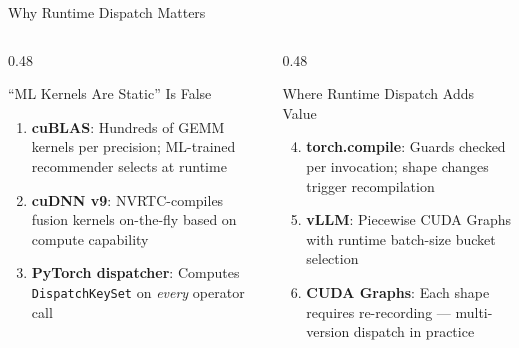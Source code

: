\documentclass[aspectratio=169,10pt]{beamer}
\begin{document}
\begin{frame}{Why Runtime Dispatch Matters}
  \begin{columns}[T]
    \begin{column}{0.48\textwidth}
      \begin{block}{``ML Kernels Are Static'' Is False}
        \begin{enumerate}
          \item \textbf{cuBLAS}: Hundreds of GEMM kernels per precision; ML-trained recommender selects at runtime
          \item \textbf{cuDNN v9}: NVRTC-compiles fusion kernels on-the-fly based on compute capability
          \item \textbf{PyTorch dispatcher}: Computes \texttt{DispatchKeySet} on \emph{every} operator call
        \end{enumerate}
      \end{block}
    \end{column}
    \begin{column}{0.48\textwidth}
      \begin{block}{Where Runtime Dispatch Adds Value}
        \begin{enumerate}\setcounter{enumi}{3}
          \item \textbf{torch.compile}: Guards checked per invocation; shape changes trigger recompilation
          \item \textbf{vLLM}: Piecewise CUDA Graphs with runtime batch-size bucket selection
          \item \textbf{CUDA Graphs}: Each shape requires re-recording --- multi-version dispatch in practice
        \end{enumerate}
      \end{block}
    \end{column}
  \end{columns}
  \vspace{0.8em}
  \begin{center}
  \end{center}
\end{frame}
\end{document}
